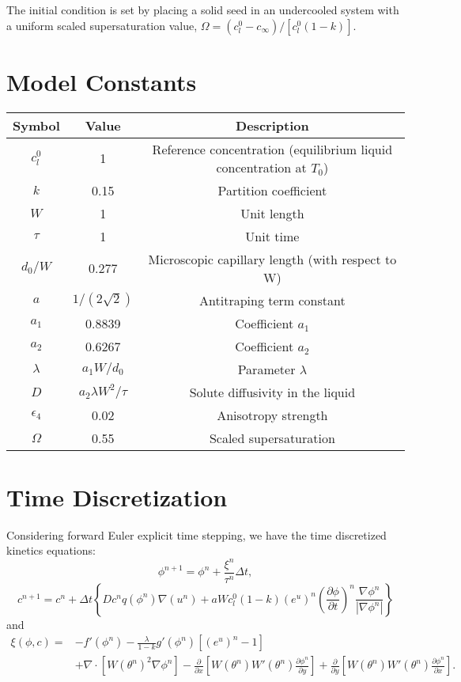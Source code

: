 \documentclass[10pt]{article}
\begin{document}
The initial condition is set by placing a solid seed in an undercooled system with a uniform scaled supersaturation value, $\Omega=(c_l^0-c_\infty)/[c_l^0(1-k)]$.

\section{Model Constants}
\label{model_constants}
\begin{center}
\begin{tabular}{ |c|c|c| } 
 \hline
 Symbol & Value & Description\\ 
 \hline
 $c_l^0$ & 1 & Reference concentration (equilibrium liquid concentration at $T_0$)\\ 
 $k$ & 0.15 & Partition coefficient\\ 
 $W$ & 1 & Unit length\\ 
 $\tau$ & 1 & Unit time\\
 $d_0/W$ & 0.277 & Microscopic capillary length (with respect to W)\\
 $a$ & $1/(2\sqrt{2})$ & Antitraping term constant\\ 
 $a_1$ & 0.8839 & Coefficient $a_1$\\ 
 $a_2$ & 0.6267 & Coefficient $a_2$\\ 
 $\lambda$ & $a_1W/d_0$ & Parameter $\lambda$\\
 $D$ & $a_2\lambda W^2/\tau$ & Solute diffusivity in the liquid\\
 $\epsilon_4$ & 0.02 & Anisotropy strength\\ 
 $\Omega$ & 0.55 & Scaled supersaturation\\ 
 \hline
\end{tabular}
\end{center}

\section{Time Discretization}
Considering forward Euler explicit time stepping, we have the time discretized kinetics equations:
\begin{equation}
\phi^{n+1}=\phi^{n} + \frac{\xi^n}{\tau^n}\Delta t,
\end{equation}
\begin{equation}
c^{n+1}=c^{n}+\Delta t \left \{ D c^n q(\phi^n)\nabla(u^n) + aWc_l^0(1-k)(e^u)^n \left(\frac{\partial \phi}{\partial t}\right)^n\frac{\nabla \phi^n}{|\nabla \phi^n|} \right \} 
\end{equation}
and
\begin{equation}
\begin{split}
\xi(\phi,c) = & -f'(\phi^n) - \frac{\lambda}{1-k} g'(\phi^n)[(e^u)^n - 1]\\
& + \nabla \cdot [W(\theta^n)^2\nabla \phi^n]-\frac{\partial}{\partial x} \left[W(\theta^n)W'(\theta^n)\frac{\partial \phi^n}{\partial y}\right] + \frac{\partial}{\partial y} \left[W(\theta^n)W'(\theta^n)\frac{\partial \phi^n}{\partial x}\right].
\end{split}
\end{equation}
\end{document}
